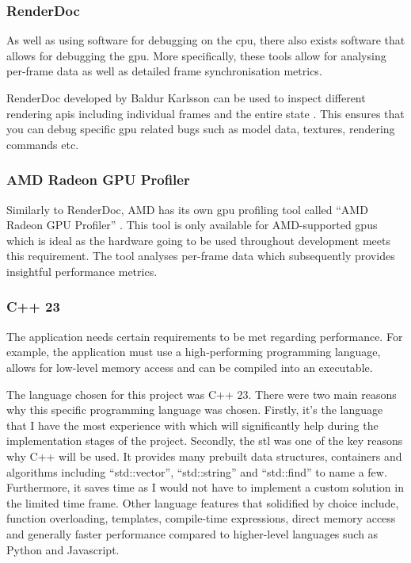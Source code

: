 \documentclass[11pt]{article}
\begin{document}
\subsubsection{RenderDoc}
As well as using software for debugging on the \gls*{cpu}, there also exists
software that allows for debugging the \gls*{gpu}. More specifically, these tools
allow for analysing per-frame data as well as detailed frame synchronisation
metrics.

RenderDoc developed by Baldur Karlsson can be used to inspect different
rendering \glspl*{api} including individual frames and the entire state
\cite{renderdoc}. This ensures that you can debug specific \gls*{gpu} related
bugs such as model data, textures, rendering commands etc.


\subsubsection{AMD Radeon GPU Profiler}
Similarly to RenderDoc, AMD has its own \gls*{gpu} profiling tool called ``AMD
Radeon GPU Profiler'' \cite{rgp}. This tool is only available for AMD-supported
\glspl*{gpu} which is ideal as the hardware going to be used throughout
development meets this requirement. The tool analyses per-frame data which
subsequently provides insightful performance metrics.



\subsubsection{C++ 23}
The application needs certain requirements to be met regarding performance. For
example, the application must use a high-performing programming language, allows
for low-level memory access and can be compiled into an executable.

The language chosen for this project was C++ 23.  There were two main reasons
why this specific programming language was chosen. Firstly, it's the language
that I have the most experience with which will significantly help during the
implementation stages of the project. Secondly, the \gls*{stl}  was one of the
key reasons why C++ will be used. It provides many prebuilt data structures,
containers and algorithms including ``std::vector'', ``std::string'' and
``std::find'' to name a few. Furthermore, it saves time as I would not have to
implement a custom solution in the limited time frame. Other language features
that solidified by choice include, function overloading, templates, compile-time
expressions, direct memory access and generally faster performance compared to
higher-level languages such as Python and Javascript.
\end{document}
